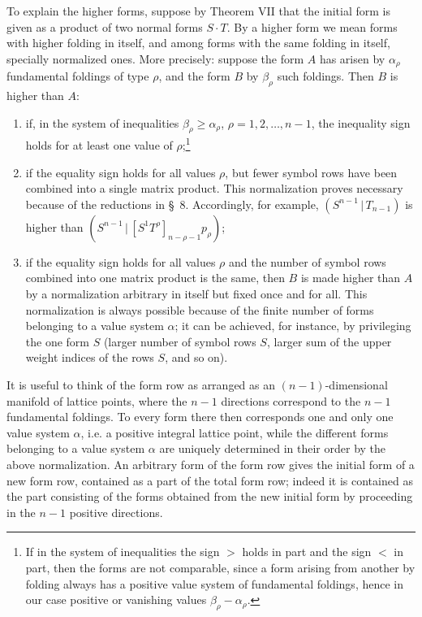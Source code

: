 \documentclass[11pt]{article}
\providecommand{\pair}[2]{(#1\,|\,#2)}
\begin{document}
To explain the higher forms, suppose by Theorem VII that the initial form is given as a product of two normal forms $S\cdot T$. By a higher form we mean forms with higher folding in itself, and among forms with the same folding in itself, specially normalized ones. More precisely: suppose the form $A$ has arisen by $\alpha_\rho$ fundamental foldings of type $\rho$, and the form $B$ by $\beta_\rho$ such foldings. Then $B$ is higher than $A$:
\begin{enumerate}
\item if, in the system of inequalities $\beta_\rho\ge\alpha_\rho$, $\rho=1,2,\ldots,n-1$, the inequality sign holds for at least one value of $\rho$;\footnote{If in the system of inequalities the sign $>$ holds in part and the sign $<$ in part, then the forms are not comparable, since a form arising from another by folding always has a positive value system of fundamental foldings, hence in our case positive or vanishing values $\beta_\rho-\alpha_\rho$.}
\item if the equality sign holds for all values $\rho$, but fewer symbol rows have been combined into a single matrix product. This normalization proves necessary because of the reductions in \S\ 8. Accordingly, for example, $\pair{S^{n-1}}{T_{n-1}}$ is higher than $\pair{S^{n-1}}{[S^1T^\rho]_{n-\rho-1}p_\rho}$;
\item if the equality sign holds for all values $\rho$ and the number of symbol rows combined into one matrix product is the same, then $B$ is made higher than $A$ by a normalization arbitrary in itself but fixed once and for all. This normalization is always possible because of the finite number of forms belonging to a value system $\alpha$; it can be achieved, for instance, by privileging the one form $S$ (larger number of symbol rows $S$, larger sum of the upper weight indices of the rows $S$, and so on).
\end{enumerate}
It is useful to think of the form row as arranged as an $(n-1)$-dimensional manifold of lattice points, where the $n-1$ directions correspond to the $n-1$ fundamental foldings. To every form there then corresponds one and only one value system $\alpha$, i.e. a positive integral lattice point, while the different forms belonging to a value system $\alpha$ are uniquely determined in their order by the above normalization. An arbitrary form of the form row gives the initial form of a new form row, contained as a part of the total form row; indeed it is contained as the part consisting of the forms obtained from the new initial form by proceeding in the $n-1$ positive directions.
\end{document}
